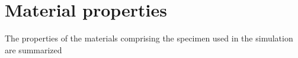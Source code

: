 

\chapter{Material properties}
\label{app:properties}

The properties of the materials comprising the specimen used in the simulation are summarized 